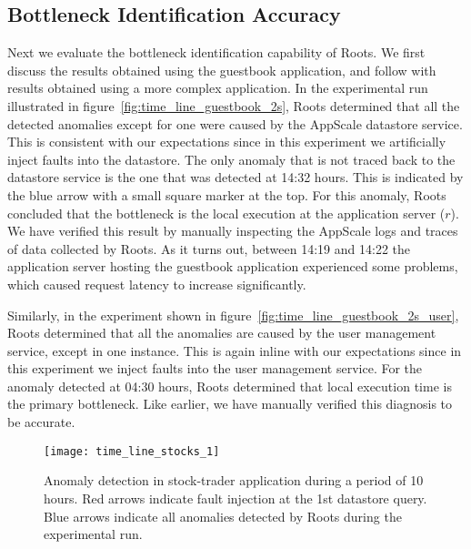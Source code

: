 \subsection{Bottleneck Identification Accuracy}
Next we evaluate the bottleneck identification capability of Roots. We first discuss the results obtained using
the guestbook application, and follow with
results obtained using a more complex application.
In the experimental run illustrated in 
figure~\ref{fig:time_line_guestbook_2s}, Roots determined that all the detected anomalies except for one were 
caused by the AppScale datastore service. This is consistent with our expectations since in this experiment we 
artificially inject faults into the datastore. 
The only anomaly that is not traced back to the datastore service is the one that was detected at 14:32 hours.
This is indicated by the blue arrow with a small square marker at the top. For this anomaly, Roots concluded that
the bottleneck is the local execution at the application server ($r$). We have verified
this result by manually inspecting the AppScale logs and traces of data collected by Roots. As it turns out,
between 14:19 and
14:22 the application server hosting the guestbook application experienced some problems, which caused
request latency to increase significantly. 

Similarly, in the experiment shown in figure~\ref{fig:time_line_guestbook_2s_user}, Roots determined
that all the anomalies are caused by the user management service, except in one instance. This is again
inline with our expectations since in this experiment we inject faults into the user management service. For the
anomaly detected at 04:30 hours, Roots determined that local execution time is the primary bottleneck.
Like earlier, we have manually verified this diagnosis to be accurate.

\begin{figure}
\centering
\texttt{[image: time\_line\_stocks\_1]}
\caption{Anomaly detection in stock-trader application during a period of 10 hours. Red arrows indicate fault injection
at the 1st datastore query. Blue arrows indicate all anomalies detected by Roots during the experimental run.}
\label{fig:time_line_stocks_1}
\end{figure}

